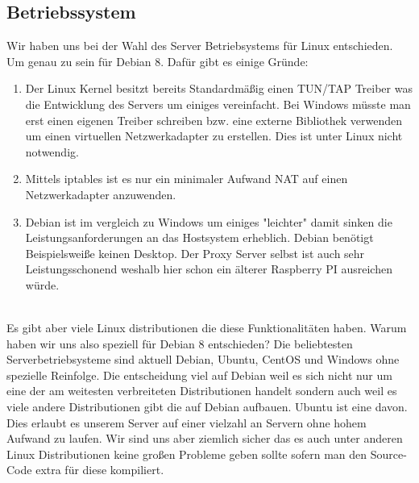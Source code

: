 \subsection{Betriebssystem}
Wir haben uns bei der Wahl des Server Betriebsystems für Linux entschieden. Um genau zu sein für Debian 8. 
Dafür gibt es einige Gründe:
\\
\begin{enumerate}
    \item Der Linux Kernel besitzt bereits Standardmäßig einen TUN/TAP Treiber was die Entwicklung des Servers um einiges vereinfacht. Bei Windows müsste man erst einen eigenen Treiber schreiben bzw. eine externe Bibliothek verwenden um einen virtuellen Netzwerkadapter zu erstellen. Dies ist unter Linux nicht notwendig.
    \item Mittels iptables ist es nur ein minimaler Aufwand NAT auf einen Netzwerkadapter anzuwenden. 
    \item Debian ist im vergleich zu Windows um einiges "leichter" damit sinken die Leistungsanforderungen an das Hostsystem erheblich. Debian benötigt Beispielsweiße keinen Desktop. Der Proxy Server selbst ist auch sehr Leistungsschonend weshalb hier schon ein älterer Raspberry PI ausreichen würde.
\end{enumerate}
\ \\
Es gibt aber viele Linux distributionen die diese Funktionalitäten haben. Warum haben wir uns also speziell für Debian 8 entschieden? Die beliebtesten Serverbetriebsysteme sind aktuell Debian, Ubuntu, CentOS und Windows ohne spezielle Reinfolge. Die entscheidung viel auf Debian weil es sich nicht nur um eine der am weitesten verbreiteten Distributionen handelt sondern auch weil es viele andere Distributionen gibt die auf Debian aufbauen. Ubuntu ist eine davon. Dies erlaubt es unserem Server auf einer vielzahl an Servern ohne hohem Aufwand zu laufen. Wir sind uns aber ziemlich sicher das es auch unter anderen Linux Distributionen keine großen Probleme geben sollte sofern man den Source-Code extra für diese kompiliert.


